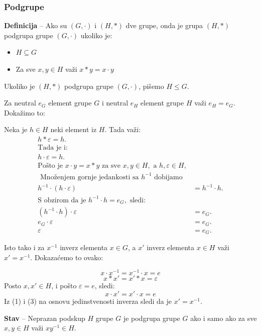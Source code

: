 \documentclass[a4paper,12pt]{article}
\begin{document}
\subsubsection{Podgrupe}

\textbf{Definicija} -- Ako su \( (G, \cdot)\) i \((H, * ) \) dve grupe, onda je grupa \( (H, * ) \) podgrupa grupe \( (G, \cdot) \) ukoliko je:

\begin{itemize}
  \item \( H \subseteq G \)
  \item Za sve \( x, y \in H \) važi \( x * y = x \cdot y \)
\end{itemize}
Ukoliko je \( (H, * ) \) podgrupa grupe \( (G, \cdot) \), pišemo \( H \leq G \).
\medskip

Za neutral \( e_G \) element grupe \( G \) i neutral \( e_H \) element grupe \( H \) važi \( e_H = e_G \).
Dokažimo to: 

Neka je \(h \in H \) neki element iz \( H \). Tada važi:
\[\begin{aligned}
  h*\varepsilon = h. \\
  \text{Tada je i: } \\
  h \cdot \varepsilon = h. \\
  \text{Pošto je } x \cdot y = x * y \text{ za sve } x, y \in H, \text{ a } h, \varepsilon \in H, \\
  \text{ Množenjem gornje jedankosti sa } h^{-1} \text{ dobijamo } \\
  h^{-1} \cdot (h \cdot \varepsilon) &= h^{-1} \cdot h. \\
  \text{S obzirom da je } h^{-1} \cdot h = e_G, \text{ sledi: } \\
  (h^{-1} \cdot h) \cdot \varepsilon &= e_G. \\
  e_G \cdot \varepsilon &= e_G. \\
  \varepsilon &= e_G. 
\end{aligned}\]

Isto tako i za \( x^{-1} \) inverz elementa \( x \in G \), a \( x' \) inverz elementa \( x \in H \) važi \( x' = x^{-1} \).
Dokazaćemo to ovako:

\[
  x \cdot x^{-1} = x^{-1} \cdot x = e \tag{1}
\]
\[
  x * x' = x' * x = \varepsilon \tag{2}
\]
Posto \( x, x' \in H \), i pošto \( \varepsilon = e \), sledi:
\[
  x \cdot x' = x' \cdot x = e \tag{3}
\]
Iz (1) i (3) na osnovu jedinstvenosti inverza sledi da je \( x' = x^{-1} \).

\bigskip
\textbf{Stav} -- Neprazan podskup \( H \) grupe \( G \) je podgrupa grupe \( G \) ako i samo ako za sve \( x, y \in H \) važi \( xy^{-1} \in H \).
\end{document}
